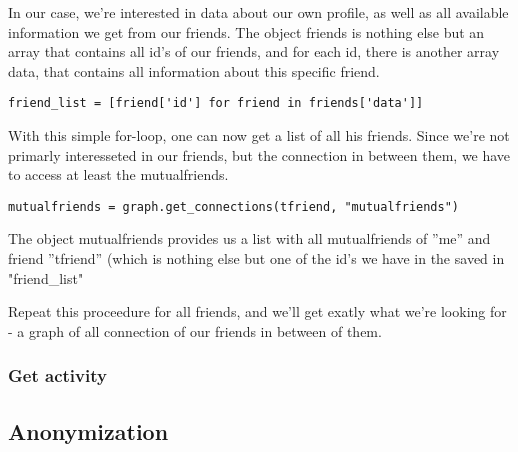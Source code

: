 In our case, we're interested in data about our own profile, as well as all available information we get from our friends.
The object friends is nothing else but an array that contains all id's of our friends, and for each id, there is another array data, that contains all information about this specific friend.  

\begin{lstlisting}
friend_list = [friend['id'] for friend in friends['data']]
\end{lstlisting}

With this simple for-loop, one can now get a list of all his friends. Since we're not primarly interesseted in our friends, but the connection in between them, we have to access at least the mutualfriends. 

\begin{lstlisting}
mutualfriends = graph.get_connections(tfriend, "mutualfriends")
\end{lstlisting}

The object mutualfriends provides us a list with all mutualfriends of ''me'' and friend ''tfriend'' (which is nothing else but one of the id's we have in the saved in "friend\_list"

Repeat this proceedure for all friends, and we'll get exatly what we're looking for - a graph of all connection of our friends in between of them.

\subsubsection{Get activity}

 

\subsection{Anonymization}



